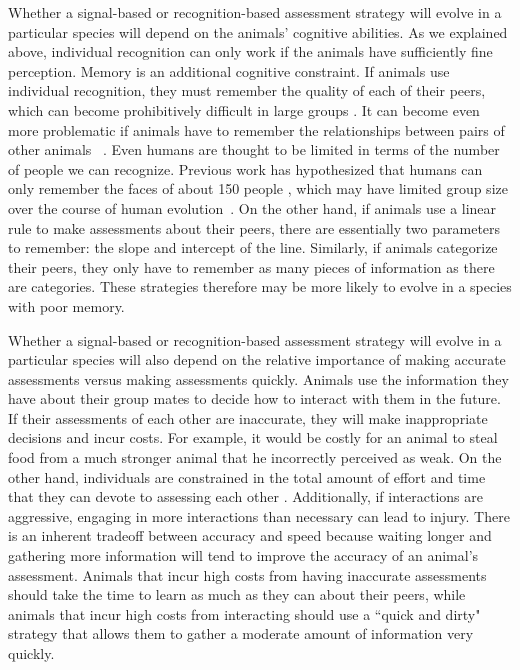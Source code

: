Whether a signal-based or recognition-based assessment strategy will evolve in a particular species will depend on the animals' cognitive abilities. As we explained above, individual recognition can only work if the animals have sufficiently fine perception. Memory is an additional cognitive constraint. If animals use individual recognition, they must remember the quality of each of their peers, which can become prohibitively difficult in large groups  \citep{Rohwer:1982fk,Solberg:1997uq}. It can become even more problematic if animals have to remember the relationships between pairs of other animals ~\citep{Seyfarth2015SocialCognition}. Even humans are thought to be limited in terms of the number of people we can recognize. Previous work has hypothesized that humans can only remember the faces of about 150 people \citep{Dunbar:1993zr,Hill:2003ly}, which may have limited group size over the course of human evolution~\citep{Dunbar:1992ys,Dunbar:1993zr}. On the other hand, if animals use a linear rule to make assessments about their peers, there are essentially two parameters to remember: the slope and intercept of the line. Similarly, if animals categorize their peers, they only have to remember as many pieces of information as there are categories. These strategies therefore may be more likely to evolve in a species with poor memory.

Whether a signal-based or recognition-based assessment strategy will evolve in a particular species will also depend on the relative importance of making accurate assessments versus making assessments quickly. Animals use the information they have about their group mates to decide how to interact with them in the future. If their assessments of each other are inaccurate, they will make inappropriate decisions and incur costs. For example, it would be costly for an animal to steal food from a much stronger animal that he incorrectly perceived as weak. On the other hand, individuals are constrained in the total amount of effort and time that they can devote to assessing each other \citep{MacIver:2010ve}. Additionally, if interactions are aggressive, engaging in more interactions than necessary can lead to injury. There is an inherent tradeoff between accuracy and speed because waiting longer and gathering more information will tend to improve the accuracy of an animal's assessment. Animals that incur high costs from having inaccurate assessments should take the time to learn as much as they can about their peers, while animals that incur high costs from interacting should use a ``quick and dirty" strategy that allows them to gather a moderate amount of information very quickly. 

